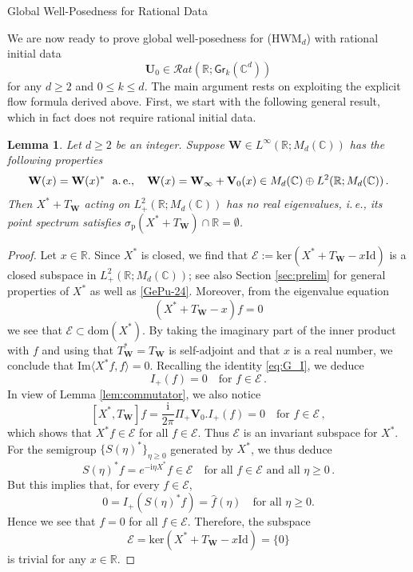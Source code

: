 \documentclass[11pt,reqno]{amsart}
\makeatletter
\newtheorem{lem}{Lemma}[section]
\theoremstyle{definition}
\theoremstyle{remark}
\theoremstyle{remark}
\numberwithin{equation}{section}
\newcommand{\C}{\mathbb{C}}
\newcommand{\R}{\mathbb{R}}
\newcommand{\EE}{\mathcal{E}}
\newcommand{\ii}{\mathrm{i}}
\newcommand{\Vb}{\mathbf{V}}
\newcommand{\Wb}{\mathbf{W}}
\newcommand{\Ub}{\mathbf{U}}
\newcommand{\id}{\mathrm{Id}}
\newcommand{\Gr}{\mathsf{Gr}}
\def\section{\@startsection{section}{1}%
  \z@{1.5\linespacing\@plus\linespacing}{.5\linespacing}%
  {\normalfont\bfseries\large\centering}}
\makeatother
\begin{document}

\section{Global Well-Posedness for Rational Data}

We are now ready to prove global well-posedness for (HWM$_d$) with rational initial data
$$
\Ub_0 \in \mathcal{R}at(\R; \Gr_k(\C^d))
$$
 for any $d \geq 2$ and $0 \leq k \leq d$. The main argument rests on exploiting the explicit flow formula derived above. First, we start with the following general result, which in fact does not require rational initial data.

\begin{lem} \label{lem:injective}
Let $d \geq 2$ be an integer. Suppose $\Wb \in L^\infty(\R; M_d(\C))$ has the following properties
$$
\Wb(x) = \Wb(x)^* \ \ \mbox{a.\,e.}, \quad \Wb(x) = \Wb_\infty + \Vb_0(x) \in M_d(\C) \oplus L^2(\R; M_d(\C)) \, .
$$
Then $X^*+ T_{\Wb}$ acting on $L^2_+(\R; M_d(\C))$ has no real eigenvalues, i.\,e., its point spectrum satisfies $\sigma_{\mathrm{p}}(X^*+ T_{\Wb}) \cap \R = \emptyset$.
\end{lem} 

\begin{proof}
Let $x \in \R$. Since $X^*$ is closed, we find that $\EE := \mathrm{ker}(X^*+T_{\Wb} - x\id)$ is a closed subspace in $L^2_+(\R; M_d(\C))$; see also Section \ref{sec:prelim} for general properties of $X^*$ as well as \ref{GePu-24}. Moreover, from the eigenvalue equation
$$
(X^*+ T_{\Wb} - x) f = 0 
$$
we see that $\EE \subset \mathrm{dom}(X^*)$. By taking the imaginary part of the inner product with $f$ and using that $T_{\Wb}^* = T_{\Wb}$ is self-adjoint and that $x$ is a real number, we conclude that $\mathrm{Im} \langle X^*f, f \rangle = 0$. Recalling the identity \eqref{eq:G_I}, we deduce
$$
I_+(f) = 0 \quad \mbox{for $f \in \EE$} \, .
$$
In view of Lemma \ref{lem:commutator}, we also notice
$$
[X^*, T_{\Wb}] f = \frac{\ii}{2 \pi} \Pi_+ \Vb_0.I_+(f) = 0 \quad \mbox{for $f \in \EE$} \, ,
$$
which shows that $X^* f \in \EE$ for all $f \in \EE$. Thus $\EE$ is an invariant subspace for $X^*$. For the semigroup $\{ S(\eta)^* \}_{\eta \geq 0}$ generated by $X^*$, we thus deduce
$$
S(\eta)^* f = e^{-\ii \eta X^*} f \in \EE \quad \mbox{for all $f \in \EE$ and all $\eta \geq 0$} \, .
$$
But this implies that, for every $f \in \EE$,
$$
0 = I_+(S(\eta)^* f) = \widehat{f}(\eta) \quad \mbox{for all $\eta \geq 0$}.
$$
Hence we see that $f = 0$ for all $f \in \EE$. Therefore, the subspace 
$$
\EE = \mathrm{ker}(X^*+T_{\Wb} - x\id ) = \{ 0 \}
$$
is trivial for any $x \in \R$.
\end{proof}
\end{document}
